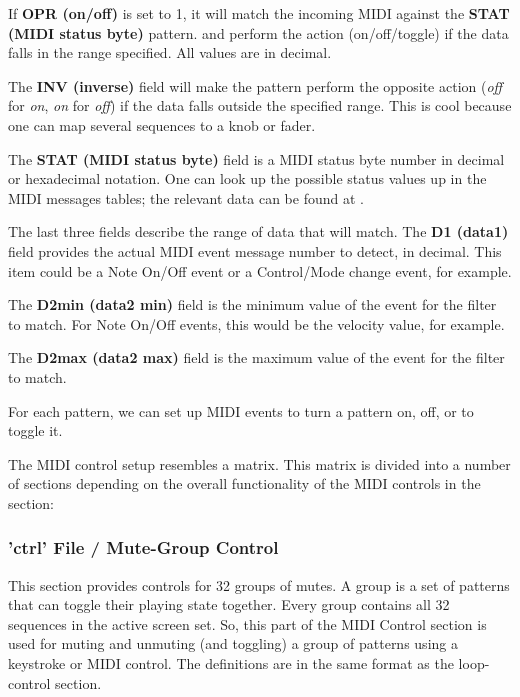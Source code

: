    If \textbf{OPR (on/off)} is set to 1, it will match the incoming MIDI
   against the \textbf{STAT (MIDI status byte)} pattern.
   and perform the action (on/off/toggle) if the data
   falls in the range specified.  All values are in decimal.

   The \textbf{INV (inverse)} field will make the pattern perform the opposite
   action (\textsl{off} for \textsl{on}, \textsl{on} for \textsl{off}) if the
   data falls outside the specified range.  This is cool because one can map
   several sequences to a knob or fader.

   The \textbf{STAT (MIDI status byte)} field is a MIDI status byte number in
   decimal or hexadecimal notation.
   One can look up the possible status values up in the MIDI messages tables;
   the relevant data can be found at \cite{midicontroltable}.

   The last three fields describe the range of data that will match.  The
   \textbf{D1 (data1)} field provides the actual MIDI event message number to
   detect, in decimal.  This item could be a Note On/Off event or a
   Control/Mode change event, for example.

   The \textbf{D2min (data2 min)} field is the minimum value of the event for
   the filter to match. For Note On/Off events, this would be the velocity
   value, for example.

   The \textbf{D2max (data2 max)} field is the maximum value of the event for
   the filter to match.


   For each pattern, we can set up MIDI events to turn a 
   pattern on, off, or to toggle it.

   The MIDI control setup resembles a matrix.  This matrix is divided into a
   number of sections depending on the overall functionality of the MIDI
   controls in the section:

\subsubsection{'ctrl' File / Mute-Group Control}
\label{subsubsec:configuration_ctrl_mute_group_control}

   This section provides controls for 32 groups of mutes.
   A group is a set of patterns that can toggle their playing state
   together.  Every group contains all 32 sequences in the active screen set.
   So, this part of the MIDI Control section is used for muting and unmuting
   (and toggling) a group of patterns using a keystroke or MIDI control.
   The definitions are in the same format as the loop-control section.

